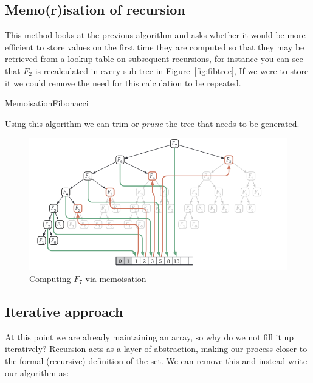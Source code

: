 \documentclass{article}
\begin{document}
\subsection{Memo(r)isation of recursion}

This method looks at the previous algorithm and asks whether it would be more efficient to store values on the first time they are computed so that they may be retrieved from a lookup table on subsequent recursions, for instance you can see that $F_{2}$ is recalculated in every sub-tree in Figure~\ref{fig:fibtree}, If we were to store it we could remove the need for this calculation to be repeated.

\begin{algorithm}
  \caption{MemoisationFibonacci}
\end{algorithm}

Using this algorithm we can trim or \textit{prune} the tree that needs to be generated.

\begin{figure}[h]
  \centering
  \includegraphics[scale=0.5]{figures/l9-2.png}
  \caption{\label{fig:memfib} Computing $F_{7}$ via memoisation}
\end{figure}

\subsection{Iterative approach}

At this point we are already maintaining an array, so why do we not fill it up iteratively? Recursion acts as a layer of abstraction, making our process closer to the formal (recursive) definition of the set. We can remove this and instead write our algorithm as:
\end{document}
